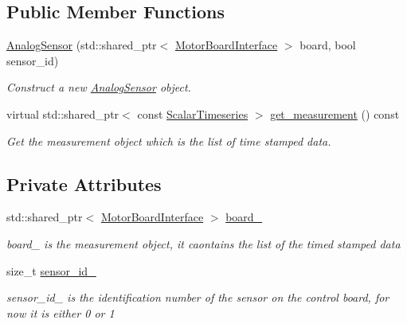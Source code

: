 \subsection*{Public Member Functions}
\begin{DoxyCompactItemize}
\item 
\hyperlink{classblmc__drivers_1_1AnalogSensor_a3107ba6bba78d46e126ffc74c88f5a69}{Analog\+Sensor} (std\+::shared\+\_\+ptr$<$ \hyperlink{classblmc__drivers_1_1MotorBoardInterface}{Motor\+Board\+Interface} $>$ board, bool sensor\+\_\+id)
\begin{DoxyCompactList}\small\item\em Construct a new \hyperlink{classblmc__drivers_1_1AnalogSensor}{Analog\+Sensor} object. \end{DoxyCompactList}\item 
virtual std\+::shared\+\_\+ptr$<$ const \hyperlink{classblmc__drivers_1_1AnalogSensorInterface_a4e4a853aa044b7d3afbaa3fe20477602}{Scalar\+Timeseries} $>$ \hyperlink{classblmc__drivers_1_1AnalogSensor_ae6edd73f6625a940a05042bef9a4c264}{get\+\_\+measurement} () const 
\begin{DoxyCompactList}\small\item\em Get the measurement object which is the list of time stamped data. \end{DoxyCompactList}\end{DoxyCompactItemize}
\subsection*{Private Attributes}
\begin{DoxyCompactItemize}
\item 
std\+::shared\+\_\+ptr$<$ \hyperlink{classblmc__drivers_1_1MotorBoardInterface}{Motor\+Board\+Interface} $>$ \hyperlink{classblmc__drivers_1_1AnalogSensor_aba119f9ef91766777134c6df9f687b7c}{board\+\_\+}\hypertarget{classblmc__drivers_1_1AnalogSensor_aba119f9ef91766777134c6df9f687b7c}{}\label{classblmc__drivers_1_1AnalogSensor_aba119f9ef91766777134c6df9f687b7c}

\begin{DoxyCompactList}\small\item\em board\+\_\+ is the measurement object, it caontains the list of the timed stamped data \end{DoxyCompactList}\item 
size\+\_\+t \hyperlink{classblmc__drivers_1_1AnalogSensor_aaa093ae58c295f8da66bc23d1f241095}{sensor\+\_\+id\+\_\+}\hypertarget{classblmc__drivers_1_1AnalogSensor_aaa093ae58c295f8da66bc23d1f241095}{}\label{classblmc__drivers_1_1AnalogSensor_aaa093ae58c295f8da66bc23d1f241095}

\begin{DoxyCompactList}\small\item\em sensor\+\_\+id\+\_\+ is the identification number of the sensor on the control board, for now it is either 0 or 1 \end{DoxyCompactList}\end{DoxyCompactItemize}
